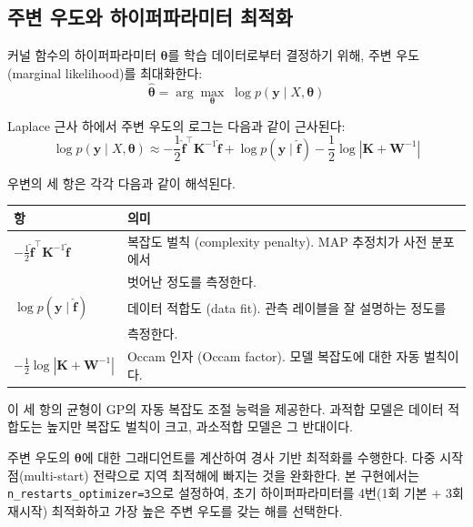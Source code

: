 \documentclass[11pt]{article}
\begin{document}
\subsection{주변 우도와 하이퍼파라미터 최적화}

커널 함수의 하이퍼파라미터 $\boldsymbol{\theta}$를 학습 데이터로부터 결정하기 위해,
주변 우도(marginal likelihood)를 최대화한다:
\begin{equation}
\hat{\boldsymbol{\theta}} = \arg\max_{\boldsymbol{\theta}} \; \log p(\mathbf{y} \mid X, \boldsymbol{\theta})
\label{eq:hyperopt}
\end{equation}

Laplace 근사 하에서 주변 우도의 로그는 다음과 같이 근사된다:
\begin{equation}
\log p(\mathbf{y} \mid X, \boldsymbol{\theta}) \approx -\frac{1}{2} \hat{\mathbf{f}}^\top \mathbf{K}^{-1} \hat{\mathbf{f}} + \log p(\mathbf{y} \mid \hat{\mathbf{f}}) - \frac{1}{2} \log |\mathbf{K} + \mathbf{W}^{-1}|
\label{eq:marginal_likelihood}
\end{equation}

우변의 세 항은 각각 다음과 같이 해석된다.

\begin{table}[h]
\centering
\begin{tabular}{ll}
\toprule
항 & 의미 \\
\midrule
$-\frac{1}{2}\hat{\mathbf{f}}^\top \mathbf{K}^{-1}\hat{\mathbf{f}}$ &
  복잡도 벌칙 (complexity penalty). MAP 추정치가 사전 분포에서 \\
  & 벗어난 정도를 측정한다. \\
$\log p(\mathbf{y} \mid \hat{\mathbf{f}})$ &
  데이터 적합도 (data fit). 관측 레이블을 잘 설명하는 정도를 \\
  & 측정한다. \\
$-\frac{1}{2}\log|\mathbf{K} + \mathbf{W}^{-1}|$ &
  Occam 인자 (Occam factor). 모델 복잡도에 대한 자동 벌칙이다. \\
\bottomrule
\end{tabular}
\end{table}

이 세 항의 균형이 GP의 자동 복잡도 조절 능력을 제공한다.
과적합 모델은 데이터 적합도는 높지만 복잡도 벌칙이 크고, 과소적합 모델은 그 반대이다.

주변 우도의 $\boldsymbol{\theta}$에 대한 그래디언트를 계산하여 경사 기반 최적화를 수행한다.
다중 시작점(multi-start) 전략으로 지역 최적해에 빠지는 것을 완화한다.
본 구현에서는 \texttt{n\_restarts\_optimizer=3}으로 설정하여,
초기 하이퍼파라미터를 4번(1회 기본 + 3회 재시작) 최적화하고 가장 높은 주변 우도를 갖는 해를 선택한다.
\end{document}
